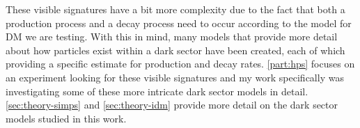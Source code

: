 These visible signatures have a bit more complexity due to the fact that both a production process
and a decay process need to occur according to the model for DM we are testing. With this in mind,
many models that provide more detail about how particles exist within a dark sector have been
created, each of which providing a specific estimate for production and decay rates.
\cref{part:hps} focuses on an experiment looking for these visible signatures and my work
specifically was investigating some of these more intricate dark sector models in detail.
\cref{sec:theory-simps} and \cref{sec:theory-idm} provide more detail on the dark sector models
studied in this work.

%
%
